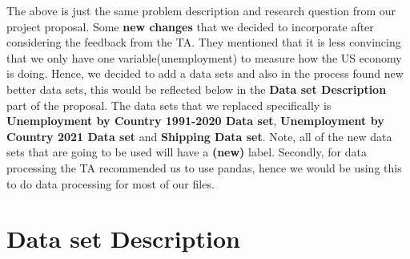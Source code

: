 \documentclass[fontsize=11pt]{article}
\begin{document}
The above is just the same problem description and research question from our project proposal. Some \textbf{new changes} that we decided to incorporate after considering the feedback from the TA. They mentioned that it is less convincing that we only have one variable(unemployment) to measure how the US economy is doing. Hence, we decided to add a data sets and also in the process found new better data sets, this would be reflected below in the \textbf{Data set Description} part of the proposal. The data sets that we replaced specifically is \textbf{Unemployment by Country 1991-2020 Data set}, \textbf{Unemployment by Country 2021 Data set} and \textbf{Shipping Data set}. Note, all of the new data sets that are going to be used will have a \textbf{(new)} label. Secondly, for data processing the TA recommended us to use pandas, hence we would be using this to do data processing for most of our files.

\section*{Data set Description}
\end{document}
